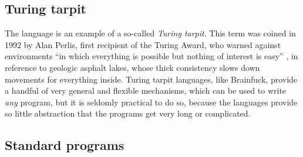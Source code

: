 \documentclass{sig-alternate}
\begin{document}
\subsection{Turing tarpit}

The language is an example of a so-called \emph{Turing tarpit}. This term was coined in 1992 by Alan Perlis, first recipient of the Turing Award, who warned against environments “in which everything is possible but nothing of interest is easy” \cite{perlis1982epigrams}, in reference to geologic asphalt lakes, whose thick consistency slows down movements for everything inside. Turing tarpit languages, like Brainfuck, provide a handful of very general and flexible mechanisms, which can be used to write \emph{any} program, but it is seldomly practical to do so, because the languages provide so little abstraction that the programs get very long or complicated.

\subsection{Standard programs}



\end{document}
